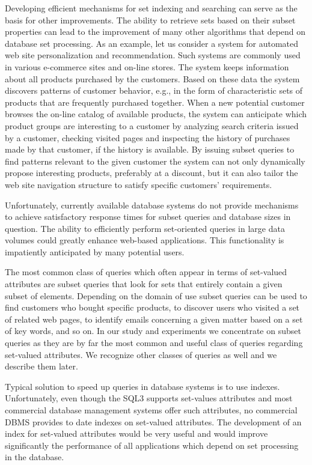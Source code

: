 \documentclass[12pt, a4paper]{article}
\begin{document}
Developing efficient mechanisms for set indexing and searching can serve as the basis for other improvements. The ability to retrieve sets based on their subset properties can lead to the improvement of many other algorithms that depend on database set processing. As an example, let us consider a system for automated web site personalization and recommendation. Such systems are commonly used in various e-commerce sites and on-line stores. The system keeps information about all products purchased by the customers. Based on these data the system discovers patterns of customer behavior, e.g., in the form of characteristic sets of products that are frequently purchased together. When a new potential customer browses the on-line catalog of available products, the system can anticipate which product groups are interesting to a customer by analyzing search criteria issued by a customer, checking visited pages and inspecting the history of purchases made by that customer, if the history is available. By issuing subset queries to find patterns relevant to the given customer the system can not only dynamically propose interesting products, preferably at a discount, but it can also tailor the web site navigation structure to satisfy specific customers’ requirements.

Unfortunately, currently available database systems do not provide mechanisms to achieve satisfactory response times for subset queries and database sizes in question. The ability to efficiently perform set-oriented queries in large data volumes could greatly enhance web-based applications. This functionality is impatiently anticipated by many potential users.

The most common class of queries which often appear in terms of set-valued attributes are subset queries that look for sets that entirely contain a given subset of elements. Depending on the domain of use subset queries can be used to find customers who bought specific products, to discover users who visited a set of related web pages, to identify emails concerning a given matter based on a set of key words, and so on. In our study and experiments we concentrate on subset queries as they are by far the most common and useful class of queries regarding set-valued attributes. We recognize other classes of queries as well and we describe them later.

Typical solution to speed up queries in database systems is to use indexes. Unfortunately, even though the SQL3 supports set-values attributes and most commercial database management systems offer such attributes, no commercial DBMS provides to date indexes on set-valued attributes. The development of an index for set-valued attributes would be very useful and would improve significantly the performance of all applications which depend on set processing in the database.
\end{document}
